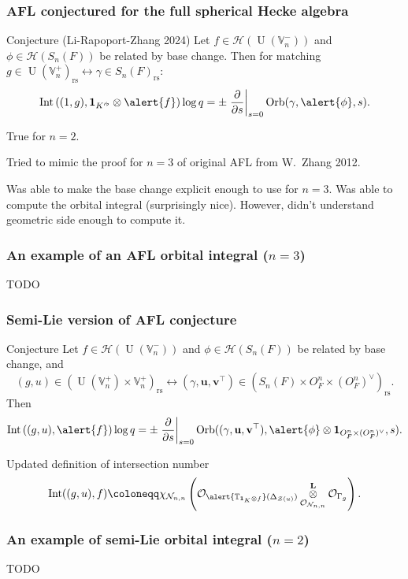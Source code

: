 \documentclass[11pt]{beamer}
\DeclareMathOperator{\Int}{Int}
\DeclareMathOperator{\Orb}{Orb}
\DeclareMathOperator{\U}{U}
\newcommand{\HH}{\mathcal{H}}
\newcommand{\VV}{\mathbb{V}}
\newcommand{\TT}{\mathbb{T}}
\renewcommand{\OO}{O}
\newcommand{\RZ}{\mathcal{N}}
\newcommand{\Sheaf}{\mathcal O}
\newcommand{\ZD}{\mathcal{Z}}
\newcommand{\guv}{{(\gamma, \uu, \vv^\top)}}
\newcommand{\jiao}{\mathop{\otimes}^{\mathbf{L}}} %
\newcommand{\oneV}{\mathbf{1}_{\OO_F^n \times (\OO_F^n)^\vee}}
\newcommand{\rs}{_{\text{rs}}}
\newcommand{\uu}{\mathbf{u}}
\newcommand{\vv}{\mathbf{v}}
\begin{document}
\begin{frame}
  \frametitle{AFL conjectured for the full spherical Hecke algebra}
  \begin{exampleblock}{Conjecture (Li-Rapoport-Zhang 2024)}
    Let \alert{$f \in \HH(\U(\VV_n^-))$} and \alert{$\phi \in \HH(S_n(F))$}
    be \alert{related by base change}.
    Then for matching $g \in \U(\VV_n^+)\rs \longleftrightarrow \gamma \in S_n(F)\rs$:
    \[ \Int\left( (1,g), \mathbf{1}_{K'^\flat} \otimes \alert{f} \right) \log q
    = \pm \left. \pdv{}{s} \right\rvert_{s=0} \Orb(\gamma, \alert{\phi}, s). \]
  \end{exampleblock}
  \begin{theorem}
    True for $n = 2$.
  \end{theorem}
  Tried to mimic the proof for $n = 3$ of original AFL from W.\ Zhang 2012.
  \begin{itemize}
  \ii Was able to make the base change explicit enough to use for $n = 3$.
  \ii Was able to compute the orbital integral (surprisingly nice).
  \ii However, didn't understand geometric side enough to compute it.
  \end{itemize}
\end{frame}

\begin{frame}
  \frametitle{An example of an AFL orbital integral ($n=3$)}
  TODO
\end{frame}

\begin{frame}
  \frametitle{Semi-Lie version of AFL conjecture}
  \begin{exampleblock}{Conjecture}
    Let \alert{$f \in \HH(\U(\VV_n^-))$} and \alert{$\phi \in \HH(S_n(F))$}
    be \alert{related by base change}, and
    \[ (g, u) \in (\U(\VV_n^+) \times \VV_n^+)\rs \longleftrightarrow
    (\gamma, \uu, \vv^\top) \in (S_n(F) \times \OO_F^n \times (\OO_F^n)^\vee)\rs. \]
    Then
    \[
      \Int\left( (g,u), \alert{f} \right) \log q
      = \pm \left. \pdv{}{s} \right\rvert_{s=0}
      \Orb(\guv, \alert{\phi} \otimes \oneV, s).
    \]
  \end{exampleblock}
  \begin{block}{Updated definition of intersection number}
    \[
      \Int((g,u), f)
      \coloneqq \chi_{\RZ_{n,n}} \left(
      \Sheaf_{\alert{\TT_{\mathbf{1}_K \otimes f}}(\Delta_{\ZD(u)})}
      \jiao_{\Sheaf_{\RZ_{n,n}}} \Sheaf_{\Gamma_g} \right).
    \]
  \end{block}
\end{frame}

\begin{frame}
  \frametitle{An example of semi-Lie orbital integral ($n=2$)}
  TODO
\end{frame}
\end{document}

